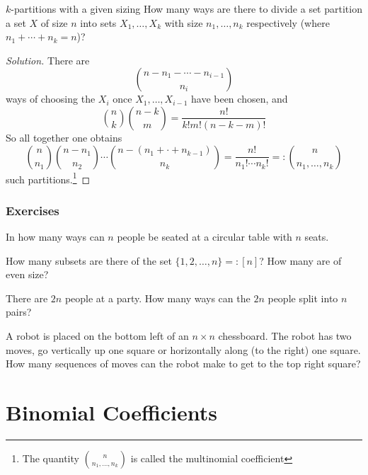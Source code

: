 \documentclass{article}
\begin{document}
\begin{problem}[]{$k$-partitions with a given sizing}
    How many ways are there to divide a set partition a set $X$ of size $n$ into sets $X_1, \dots, X_k$ with size $n_1, \dots, n_k$ respectively 
    (where $n_1 + \cdots + n_k = n$)?
\end{problem}

\begin{proof}[Solution]
    There are 
    \[\binom{n - n_1 - \cdots - n_{i-1}}{n_i}\]
    ways of choosing the $X_i$ once $X_1, \dots, X_{i-1}$ have been chosen, and 
    \[\binom{n}{k}\binom{n - k}{m} = \frac{n!}{k!m!(n-k-m)!}\] 
    So all together one obtains 
    \[\binom{n}{n_1}\binom{n-n_1}{n_2}\cdots\binom{n - (n_1 + \cdot + n_{k-1})}{n_k} = \frac{n!}{n_1!\cdots n_k!} =: \binom{n}{n_1, \dots, n_k}\]
    such partitions.\footnote{The quantity $\binom{n}{n_1, \dots, n_k}$ is called the multinomial coefficient}
\end{proof}

\subsubsection*{Exercises}

\begin{exercise}[]{}
    In how many ways can $n$ people be seated at a circular table with $n$ seats.
\end{exercise}

\begin{exercise}[]{}
    How many subsets are there of the set $\{1, 2, \dots, n\} =: [n]$? How many are of even size? 
\end{exercise}

\begin{exercise}[]{}
    There are $2n$ people at a party. How many ways can the $2n$ people split into $n$ pairs? 
\end{exercise}

\begin{exercise}[]{}
    A robot is placed on the bottom left of an $n \times n$ chessboard. The robot has two moves, go vertically up one square or 
    horizontally along (to the right) one square. How many sequences of moves can the robot make to get to the top right square?
\end{exercise}

\newpage

\section{Binomial Coefficients}
\end{document}
